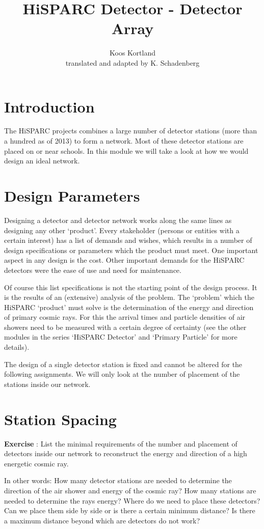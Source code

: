 \documentclass[12pt,a4paper]{article}
\author{Koos Kortland \\ translated and adapted by K. Schadenberg}
\date{}
\title{HiSPARC Detector - Detector Array}
\numberwithin{equation}{section}
\numberwithin{figure}{section}
\newcounter{Exercise}
\numberwithin{table}{section}
\begin{document}
\maketitle

\section{Introduction}
The HiSPARC projects combines a large number of detector stations (more than a hundred as of 2013) to form a network. Most of these detector stations are placed on or near schools. In this module we will take a look at how we would design an ideal network.

\section{Design Parameters}
Designing a detector and detector network works along the same lines as designing any other `product'. Every stakeholder (persons or entities with a certain interest) has a list of demands and wishes, which results in a number of design specifications or parameters which the product must meet. One important aspect in any design is the cost. Other important demands for the HiSPARC detectors were the ease of use and need for maintenance.

Of course this list specifications is not the starting point of the design process. It is the results of an (extensive) analysis of the problem. The `problem' which the HiSPARC `product' must solve is the determination of the energy and direction of primary cosmic rays. For this the arrival times and particle densities of air showers need to be measured with a certain degree of certainty (see the other modules in the series `HiSPARC Detector' and `Primary Particle' for more details).

The design of a single detector station is fixed and cannot be altered for the following assignments. We will only look at the number of placement of the stations inside our network.

\section{Station Spacing}
\begin{shaded}
\textbf{Exercise \theExercise {}} : List the minimal requirements of the number and placement of detectors inside our network to reconstruct the energy and direction of a high energetic cosmic ray.

In other words: How many detector stations are needed to determine the direction of the air shower and energy of the cosmic ray? How many stations are needed to determine the rays energy? Where do we need to place these detectors? Can we place them side by side or is there a certain minimum distance? Is there a maximum distance beyond which are detectors do not work?\end{shaded}
\end{document}
